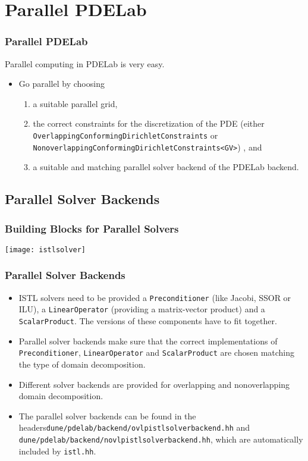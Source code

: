 \section{Parallel PDELab}

\begin{frame}
  \frametitle<presentation>{Parallel PDELab}
Parallel computing in PDELab is very easy.
  \begin{itemize}
  \item Go parallel by choosing
    \begin{enumerate}
    \item a suitable parallel grid,
    \item the correct constraints for the discretization of
      the PDE (either \lstinline!OverlappingConformingDirichletConstraints! or \lstinline!NonoverlappingConformingDirichletConstraints<GV>!) , and
    \item a suitable and matching parallel solver backend of the
      PDELab backend.
    \end{enumerate}
  \end{itemize}
\end{frame}

\subsection{Parallel Solver Backends}
\begin{frame}
  \frametitle<presentation>{Building Blocks for Parallel Solvers}
  \texttt{[image: istlsolver]}
\end{frame}

\begin{frame}
  \frametitle<presentation>{Parallel Solver Backends}

\begin{itemize}
\item ISTL solvers need to be provided a \lstinline!Preconditioner! (like Jacobi, SSOR or ILU), a
\lstinline!LinearOperator! (providing a matrix-vector product) and
a \lstinline!ScalarProduct!. The versions of these components have to fit together.
\item Parallel solver backends make sure that the correct implementations of
\lstinline!Preconditioner!, \lstinline!LinearOperator! and \lstinline!ScalarProduct!
are chosen matching the type of domain decomposition.
\item Different solver backends are provided for overlapping and nonoverlapping domain
decomposition.
\item The parallel solver backends can be found in the headers\newline \lstinline!dune/pdelab/backend/ovlpistlsolverbackend.hh! and \newline
\lstinline!dune/pdelab/backend/novlpistlsolverbackend.hh!,\newline 
which are automatically included by \lstinline!istl.hh!.
\end{itemize}

\end{frame}


